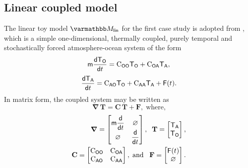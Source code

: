 \documentclass[a4paper,10pt]{article}
\begin{document}
\begin{multicols}{2}
\section{Linear coupled model}
\label{sec:linear}
The linear toy model $\mlin$ for the first case study is adopted from \citet{barsugli1998}, which is a simple one-dimensional, thermally coupled, purely temporal and stochastically forced atmosphere-ocean system of the form
\begin{equation}
\mathsf{m}\frac{\mathsf{dT}_\mathsf{O}}{\mathsf{d}t} = \mathrm{C}_\mathsf{OO}\mathsf{T_O} + \mathrm{C}_\mathsf{OA}\mathsf{T_A},\label{eq:linmodel1}
\end{equation}
\begin{equation}
\frac{\mathsf{dT}_\mathsf{A}}{\mathsf{d}t} = \mathrm{C}_\mathsf{AO}\mathsf{T_O} + \mathrm{C}_\mathsf{AA}\mathsf{T_A} + \mathsf{F}(t).\label{eq:linmodel2}
\end{equation}
In matrix form, the coupled system may be written as 
\begin{equation}
\boldsymbol{\nabla}\,\mathbf{T} = \mathbf{C}\,\mathbf{T} + \mathbf{F},\;\text{where,}\label{eq:linmodelvec}
\end{equation}
\begin{equation}
\begin{aligned}[b]
\boldsymbol{\nabla} = 
\begin{bmatrix}
    \mathsf{m}\displaystyle\frac{\mathsf{d}}{\mathsf{d}t} & \varnothing \\
    \varnothing & \displaystyle\frac{\mathsf{d}}{\mathsf{d}t} 
\end{bmatrix},\;\; 
\mathbf{T} = 
\begin{bmatrix}
    \mathsf{T_A} \\
    \mathsf{T_O} 
\end{bmatrix},
\\
\mathbf{C} = 
\begin{bmatrix}
    \mathrm{C}_\mathsf{OO} & \mathrm{C}_\mathsf{OA} \\
    \mathrm{C}_\mathsf{AO} & \mathrm{C}_\mathsf{AA} 
\end{bmatrix},\;\text{and}\;\;\;
\mathbf{F} = 
\begin{bmatrix}
    \mathsf{F}(t) \\
    \varnothing 
\end{bmatrix}.
\end{aligned}
\label{eq:linmodelvals}
\end{equation}

\end{multicols}
\end{document}
